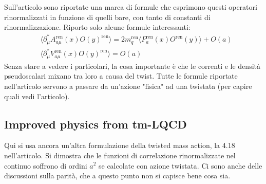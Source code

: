\documentclass[12pt,a4paper,openright]{article}
\newcommand{\la}{\langle}
\newcommand{\ra}{\rangle}
\newcommand{\colg}{\textcolor{PineGreen}}
\newcommand{\ren}{{\text{ren}}}
\begin{document}
Sull'articolo sono riportate una marea di formule che esprimono questi operatori rinormalizzati in funzione di quelli bare, con tanto di constanti di rinormalizzazione.
Riporto solo alcune formule interessanti:
\begin{equation*}
  \begin{aligned}
    & \la \partial_\mu^* A_{a\mu}^\ren (x) O(y)^\ren \ra = 2 m_q^\ren \la P_a^\ren (x) O^\ren (y) \ra +  O(a) \\
    & \la \partial_\mu^* V_{a\mu}^\ren (x) O(y)^\ren \ra = O(a)
  \end{aligned}
\end{equation*}
Senza stare a vedere i particolari, la cosa importante è che le correnti e le densità pseudoscalari mixano tra loro a causa del twist.
Tutte le formule riportate nell'articolo servono a \colg{passare da un'azione "fisica" ad una twistata (per capire quali vedi l'articolo)}.

\subsection{Improved physics from tm-LQCD}
Qui si usa ancora un'altra formulazione della twisted mass action, la 4.18 nell'articolo.
Si dimostra che le funzioni di correlazione rinormalizzate nel continuo soffrono di ordini $a^2$ se calcolate con azione twistata. Ci sono anche delle discussioni sulla parità, che a questo punto non si capisce bene cosa sia.
\end{document}
